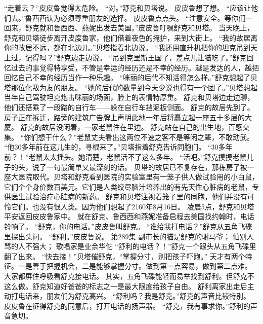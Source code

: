 \documentclass[a4paper,12pt,UTF8,twoside]{ctexbook}
\begin{document}
        “走着去？”皮皮鲁觉得太危险。  
        “对。”舒克和贝塔说。        
        皮皮鲁想了想。  
        “应该让他们去。”鲁西西认为必须尊重朋友的选择。  
        皮皮鲁点点头。  
        “注意安全。等你们一回来，舒克就和鲁西西、燕妮出发去美国。”皮皮鲁叮嘱舒克和贝塔。  
        当天晚上，舒克和贝塔徒步离开皮度鲁家，他们借着夜色的掩护，来到大街上。  
        “我的故居离你的故居不远，都在北边儿。”贝塔指着北边说。  
        “我还用直升机把你的坦克吊到天上过，记得吗？”舒克边走边说。  
        “吊到克里斯王国了，差点儿让猫吃了。”舒克回忆过去的事觉得特享受，不管是幸运的经历还是不幸的经历。越是发达的人，越把回忆自己不幸的经历当作一种乐趣。  
        “咪丽的后代不知活得怎么样。”舒克想起了贝塔那位化敌为友的朋友。  
        “她的后代的数量到今天少说也得有一个团了。”贝塔想起当年自己驾驶坦克炮击咪丽的场面，脸上的表情特厚重。  
        舒克和贝塔边走边聊，他们还搭乘了一段路的自行车——躲在自行车挡泥板侧面。  
        舒克的故居先到了。房子正在拆迁，路旁的建筑广告牌上声明此地一年后将矗立起一座五十多层的大厦。  
        舒克的故居没闲着，一家老鼠住在里边。  
        舒克站在自己的出生地，百感交集。  
        “你们想干什么？”老鼠丈夫看出这两位不速之客不是等闲之辈，不敢动武。  
        “他30多年前在这儿生的，寻根来了。”贝塔指着舒克告诉同胞们。  
        “30多年前？！”老鼠太太摇头。她清楚，老鼠活不了这么多年。  
        “活吧。”舒克摸摸老鼠儿子的头，说了一句最简单又最深刻的话。  
        贝塔的故居已不复存在，那栋房了被一座大医院取代。贝塔和舒克看到医院的实验室里有一笼子供人做试验用的小白鼠，它们个个身价数百美元。它们是人类绞尽脑汁培养出的有先天性心脏病的老鼠，专供医生试验治疗心脏病的新药。  
        舒克和贝塔注视着笼子里的同胞，他们并没有可怜它们。也没有恨人类。因为他们想起了2160年8月16日。  
        凌晨5点，舒克和贝塔平安返回皮皮鲁家中。  
        就在舒克、鲁西西和燕妮准备启程去美国找约翰时，电话铃响了。  
        “舒克，你的电话。”皮皮鲁叫舒克。        
        “谁给我打电话？”舒克从五角飞碟里探出头问。  
        “舒利。”皮皮鲁说。          第289集  
        副市长的猫是舒克的驸马爷；  
        怕别人骂的人不强大；  
        歌唱家是业余华佗    
        “舒利的电话？！”舒克一个跟头从五角飞碟里翻了出来。  
        “快去接！”贝塔催舒克，“掌握分寸，别把孩子吓跑。”  
        天才有两个特征。一是善于把握机会，二是能够掌握分寸。做到第一点容易，做到第二点难。  
        大家都屏住呼吸看舒克接电话。  
        其实，五角飞碟能轻而易举找到舒利。但舒克不这么做。舒克知道好爸爸的标志之一是最大限度给孩子自由。  
        舒利离家出走后主动打电话来，朋友们为舒克高兴。        
        “舒利吗？我是舒克。”舒克的声音比较特别。  
        皮皮鲁在征得舒克的同意后，打开电话的扬声器。  
        “舒克，我有事求你。”舒利的声音急切。  
\end{document}
